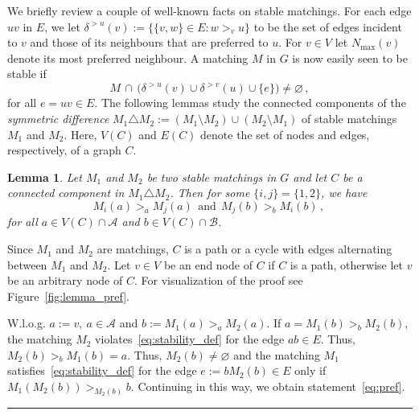 \documentclass[3p,times]{elsarticle}
\newtheorem{lemma}[fact]{Lemma}
\newenvironment{proof}{{\bf Proof:  }}{\hfill\rule{2mm}{2mm}}
\newcommand{\cA}{\mathcal{A}} \newcommand{\cB}{\mathcal{B}}
\begin{document}
We briefly review a couple of well-known facts on stable matchings. 
For each edge $uv$ in $E$, we let
$\delta^{>u}(v):=\{ \{v,w\}\in E: w >_v u \}$ to be the set of edges
incident to $v$ and those of its neighbours that are preferred to $u$. 
For $v \in V$ let $N_{\max}(v)$ denote its most preferred neighbour.  
A matching $M$ in $G$ is now easily seen to be stable if 
\begin{equation}\label{eq:stability_def}
		M \, \cap \, \big(\delta^{>u}(v) \cup \delta^{>v}(u) \cup  \{e\} \big)\neq\varnothing\,,
\end{equation}
for all $e=uv \in E$. The following lemmas study the connected components of
the {\em symmetric difference} $M_1\triangle M_2:=(M_1\setminus M_2)
\cup (M_2 \setminus M_1)$ of 
stable matchings $M_1$ and $M_2$. Here, $V(C)$ and $E(C)$ denote
the set of nodes and edges, respectively, of a graph $C$.

\begin{lemma}\label{lemma:pref}
Let $M_1$ and $M_2$ be two stable matchings in $G$ and let $C$ be a
connected component in $M_1 \triangle M_2$. Then for some
$\{i,j\}=\{1,2\}$, we have
\begin{equation}\label{eq:pref}
	M_i(a)>_a M_j(a) ~~\text{and} ~~  M_j(b)>_b M_i(b)\,,\,
\end{equation}
for all $a \in V(C) \cap \cA$ and $b \in V(C) \cap \cB$.
\end{lemma}
\begin{proof}
  Since $M_1$ and $M_2$ are matchings, $C$ is a path or a cycle with edges alternating between $M_1$ and $M_2$. Let
  $v\in V$ be an end node of $C$ if $C$ is a path, otherwise let $v$
  be an arbitrary node of $C$. For visualization of the proof see Figure~\ref{fig:lemma_pref}.

  W.l.o.g. $a:=v,\ a\in \mathcal{A}$ and $b:=M_1(a) >_a M_2(a)$. If
  $a=M_1(b) >_b M_2(b)$, the matching $M_2$
  violates~\eqref{eq:stability_def} for the edge $ab\in E$. Thus,
  $M_2(b) >_b M_1(b)=a$. Thus, $M_2(b)\neq \varnothing$ and the
  matching $M_1$ satisfies~\eqref{eq:stability_def} for the edge
  $e:=bM_2(b)\in E$ only if $M_1(M_2(b))>_{M_2(b)} b$. Continuing
  in this way, we obtain statement~\eqref{eq:pref}.
\end{proof}
\end{document}
